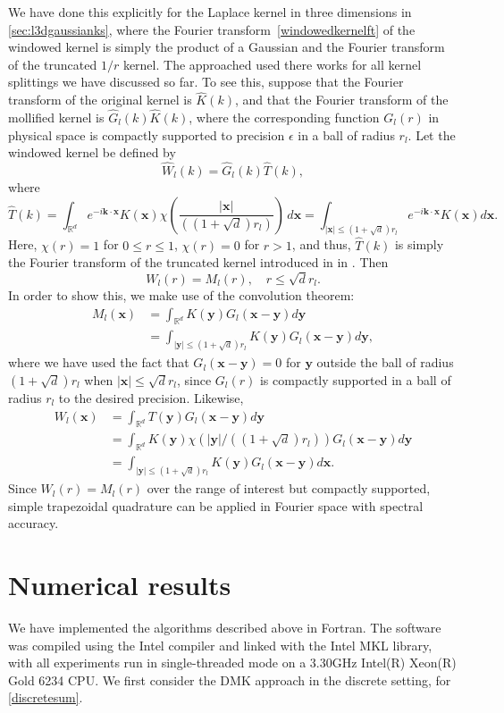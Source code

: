 \documentclass[final,letterpaper]{siamart171218}
\newcommand{\be}{\begin{equation}}
\newcommand{\ee}{\end{equation}}
\newcommand{\ba}{\begin{aligned}}
\newcommand{\ea}{\end{aligned}}
\newcommand{\x}{\boldsymbol{x}}
\newcommand{\y}{\boldsymbol{y}}
\newcommand{\bk}{\boldsymbol{k}}
\newcommand{\acron}{DMK }
\newcommand{\cR}{r}
\begin{document}
We have done this explicitly for the Laplace kernel in three dimensions in
\cref{sec:l3dgaussianks}, where the Fourier transform~\cref{windowedkernelft} of the windowed
kernel is simply the product of a Gaussian and the Fourier transform of the truncated $1/r$
kernel. The approached used there works for all kernel splittings we have discussed so far.
To see this, suppose that
the Fourier transform of the original kernel is $\hat{K}(k)$, and that the
Fourier transform of the mollified kernel is $\hat{G}_l(k) \hat{K}(k)$, where
the corresponding function $G_l(r)$ in physical space is compactly supported
to precision $\epsilon$ in a ball of radius $\cR_l$. Let the windowed kernel be defined by
\be
\widehat{W}_l(k) = \hat{G}_l(k) \hat{T}(k),
\ee
where
\be
\hat{T}(k) = 
\int_{\mathbb{R}^d}e^{-i\bk\cdot\x}K(\x)\chi \left( \frac{|\x|}{((1+\sqrt{d})\cR_l)} \right) \, d\x
=\int_{|\x|\le(1+\sqrt{d})\cR_l}e^{-i\bk\cdot\x}K(\x)d\x.
\ee
Here, $\chi(r)=1$ for $0 \leq r \leq 1$, $\chi(r)=0$ for $r > 1$, and thus, 
$\hat{T}(k)$ is simply the Fourier transform of the truncated kernel introduced in
in \cite{vico2016jcp}.
Then
\be\label{kernelequivalence}
W_l(r) = M_l(r), \quad r\le \sqrt{d}\cR_l.
\ee
In order to show this, we make use of the convolution theorem:
\be
\ba
M_l(\x)&=\int_{\mathbb{R}^d} K(\y) G_l(\x-\y)d\y\\
&=\int_{|\y|\le (1+\sqrt{d})\cR_l}K(\y) G_l(\x-\y)d\y,
\ea
\ee
where we have used the fact that $G_l(\x-\y)=0$ for $\y$ outside the ball of radius
$(1+\sqrt{d})\cR_l$ when $|\x|\le \sqrt{d}\cR_l$, since $G_l(r)$ is compactly supported in a ball
of radius $\cR_l$ to the desired precision. Likewise,
\be
\ba
W_l(\x)&=\int_{\mathbb{R}^d} T(\y) G_l(\x-\y)d\y\\
&=\int_{\mathbb{R}^d} K(\y)\chi(|\y|/((1+\sqrt{d})\cR_l)) G_l(\x-\y)d\y\\
&=\int_{|\y|\le (1+\sqrt{d})\cR_l} K(\y) G_l(\x-\y)d\x.
\ea
\ee
Since $W_l(r) = M_l(r)$ over the range of interest but compactly supported,
simple trapezoidal quadrature can be applied in Fourier space with spectral accuracy.


\section{Numerical results}

We have implemented the algorithms described above in Fortran. 
The software was compiled using the Intel compiler and linked with the Intel MKL library,
with all experiments run in single-threaded mode on a 3.30GHz Intel(R) Xeon(R) Gold 6234 CPU.
We first consider the \acron approach in the discrete setting, for \eqref{discretesum}.
\end{document}
